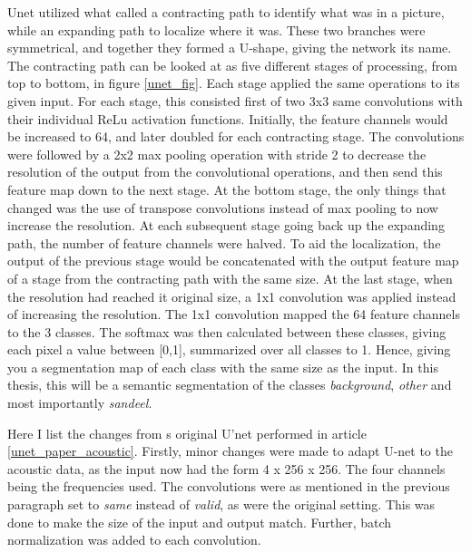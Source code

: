     Unet utilized what \citeauthor{unet_ronneberger2015}\cite{unet_ronneberger2015} called a contracting path to identify what was in a picture, while an expanding path to localize where it was. These two branches were symmetrical, and together they formed a U-shape, giving the network its name. The contracting path can be looked at as five different stages of processing, from top to bottom, in figure \ref{unet_fig}. Each stage applied the same operations to its given input. For each stage, this consisted first of two 3x3 same convolutions with their individual ReLu activation functions. Initially, the feature channels would be increased to 64, and later doubled for each contracting stage. The convolutions were followed by a 2x2 max pooling operation with stride 2 to decrease the resolution of the output from the convolutional operations, and then send this feature map down to the next stage. At the bottom stage, the only things that changed was the use of transpose convolutions instead of max pooling to now increase the resolution. At each subsequent stage going back up the expanding path, the number of feature channels were halved. To aid the localization, the output of the previous stage would be concatenated with the output feature map of a stage from the contracting path with the same size. At the last stage, when the resolution had reached it original size, a 1x1 convolution was applied instead of increasing the resolution. The 1x1 convolution mapped the 64 feature channels to the 3 classes. The softmax was then calculated between these classes, giving each pixel a value between [0,1], summarized over all classes to 1. Hence, giving you a segmentation map of each class with the same size as the input. In this thesis, this will be a semantic segmentation of the classes \textit{background}, \textit{other } and most importantly \textit{sandeel}.
    
    Here I list the changes from \citeauthor{unet_ronneberger2015}s original U'net performed in article \ref{unet_paper_acoustic}. Firstly, minor changes were made to adapt U-net to the acoustic data, as the input now had the form 4 x 256 x 256. The four channels being the frequencies used. The convolutions were as mentioned in the previous paragraph set to \textit{same} instead of \textit{valid}, as were the original setting. This was done to make the size of the input and output match. Further, batch normalization was added to each convolution. 
    
    




